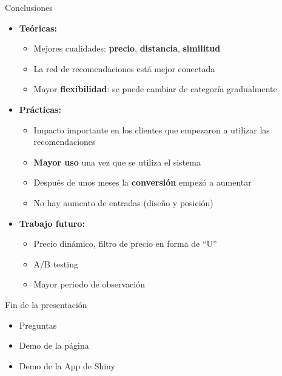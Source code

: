 \documentclass{beamer}
\begin{document}
\begin{frame}{Conclusiones}
	\begin{itemize}
		\item \textbf{Teóricas:}
		\begin{itemize}
			\item Mejores cualidades: \textbf{precio}, \textbf{distancia}, \textbf{similitud}
			\item La red de recomendaciones está mejor conectada
			\item Mayor \textbf{flexibilidad}: se puede cambiar de categoría gradualmente
		\end{itemize}
		\item \textbf{Prácticas:}
		\begin{itemize}
			\item Impacto importante en los clientes que empezaron a utilizar las recomendaciones
			\item \textbf{Mayor uso} una vez que se utiliza el sistema
			\item Después de unos meses la \textbf{conversión} empezó a aumentar
			\item No hay aumento de entradas (diseño y posición)
		\end{itemize}
		\item \textbf{Trabajo futuro:}
		\begin{itemize}
			\item Precio dinámico, filtro de precio en forma de ``U''
			\item A/B testing
			\item Mayor periodo de observación
		\end{itemize}
	\end{itemize}
\end{frame}

\begin{frame}{Fin de la presentación}
\huge
	\begin{itemize}
		\item Preguntas
		\item Demo de la página
		\item Demo de la App de Shiny
	\end{itemize}
\end{frame}
\end{document}
